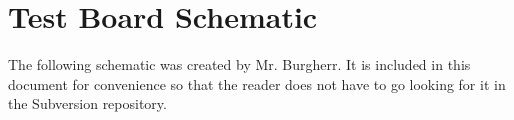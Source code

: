 \chapter{Test Board Schematic}
\label{app:testBoardSchematic}

The following  schematic was created  by Mr. Burgherr. It is included  in this
document for convenience so that the reader does not have to go looking for it
in the Subversion repository.

\clearpage

